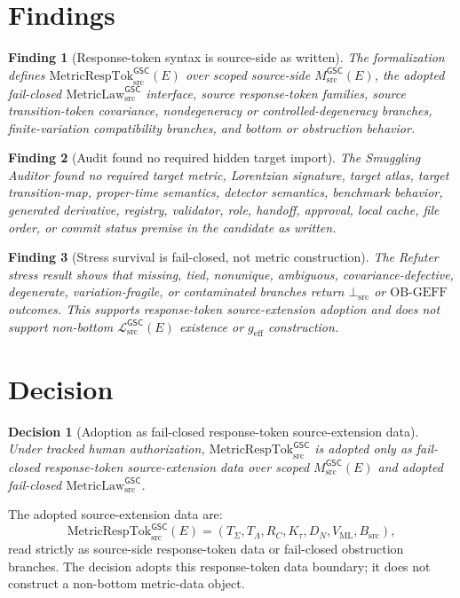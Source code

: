 \documentclass[11pt]{article}
\newcommand{\MsrcGSC}{M_{\mathrm{src}}^{\mathsf{GSC}}}
\newcommand{\MetricLaw}{\mathrm{MetricLaw}_{\mathrm{src}}^{\mathsf{GSC}}}
\newcommand{\MetricRespTok}{\mathrm{MetricRespTok}_{\mathrm{src}}^{\mathsf{GSC}}}
\newcommand{\MetricData}{\mathcal{L}_{\mathrm{src}}^{\mathsf{GSC}}}
\newcommand{\BottomSrc}{\bot_{\mathrm{src}}}
\newcommand{\OBGEFF}{\mathrm{OB\mbox{-}GEFF}}
\newcommand{\geff}{g_{\mathrm{eff}}}
\newtheorem{decision}{Decision}
\newtheorem{finding}{Finding}
\begin{document}
\section{Findings}

\begin{finding}[Response-token syntax is source-side as written]
The formalization defines \(\MetricRespTok(E)\) over scoped source-side
\(\MsrcGSC(E)\), the adopted fail-closed \(\MetricLaw\) interface, source
response-token families, source transition-token covariance, nondegeneracy or
controlled-degeneracy branches, finite-variation compatibility branches, and
bottom or obstruction behavior.
\end{finding}

\begin{finding}[Audit found no required hidden target import]
The Smuggling Auditor found no required target metric, Lorentzian signature,
target atlas, target transition-map, proper-time semantics, detector
semantics, benchmark behavior, generated derivative, registry, validator,
role, handoff, approval, local cache, file order, or commit status premise in
the candidate as written.
\end{finding}

\begin{finding}[Stress survival is fail-closed, not metric construction]
The Refuter stress result shows that missing, tied, nonunique, ambiguous,
covariance-defective, degenerate, variation-fragile, or contaminated branches
return \(\BottomSrc\) or \(\OBGEFF\) outcomes. This supports response-token
source-extension adoption and does not support non-bottom \(\MetricData(E)\)
existence or \(\geff\) construction.
\end{finding}

\section{Decision}

\begin{decision}[Adoption as fail-closed response-token source-extension data]
Under tracked human authorization, \(\MetricRespTok\) is adopted only as
fail-closed response-token source-extension data over scoped \(\MsrcGSC(E)\)
and adopted fail-closed \(\MetricLaw\).
\end{decision}

The adopted source-extension data are:
\[
  \MetricRespTok(E)
  =
  (
    T_{\Sigma},
    T_{\Lambda},
    R_C,
    K_{\tau},
    D_N,
    V_{\mathrm{ML}},
    B_{\mathrm{src}}
  ),
\]
read strictly as source-side response-token data or fail-closed obstruction
branches. The decision adopts this response-token data boundary; it does not
construct a non-bottom metric-data object.
\end{document}
